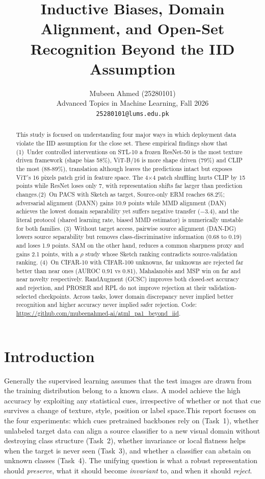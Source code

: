\documentclass{article}
\title{Inductive Biases, Domain Alignment, and Open-Set Recognition Beyond the IID Assumption}
\author{%
  Mubeen Ahmed (25280101)\\
  Advanced Topics in Machine Learning, Fall 2026\\
  \texttt{25280101@lums.edu.pk}
}
\begin{document}
\maketitle

\begin{abstract}

This study is focused on understanding four major ways in which deployment data violate the IID assumption for the close set. These empirical findings show that (1)~Under controlled interventions on STL-10 a frozen ResNet-50 is the most texture driven framework (shape bias 58\%), ViT-B/16 is more shape driven (79\%) and CLIP the most (88-89\%), translation although leaves the predictions intact but exposes ViT's 16 pixels patch grid in feature space. The 4$\times$4 patch shuffling hurts CLIP by 15 points while ResNet loses only 7, with representation shifts far larger than prediction changes.(2)~On PACS with Sketch as target, Source-only ERM reaches 68.2\%; adversarial alignment (DANN) gains 10.9 points while MMD alignment (DAN) achieves the lowest domain separability yet suffers negative transfer ($-$3.4), and the literal protocol (shared learning rate, biased MMD estimator) is numerically unstable for both families. (3)~Without target access, pairwise source alignment (DAN-DG) lowers source separability but removes class-discriminative information (0.68 to 0.19) and loses 1.9 points.  SAM on the other hand, reduces a common sharpness proxy and gains 2.1 points, with a $\rho$ study whose Sketch ranking contradicts source-validation ranking. (4)~On CIFAR-10 with CIFAR-100 unknowns, far unknowns are rejected far better than near ones (AUROC 0.91 vs 0.81), Mahalanobis and MSP win on far and near novelty respectively. RandAugment (GCSC) improves both closed-set accuracy and rejection, and PROSER and RPL do not improve rejection at their validation-selected checkpoints. Across tasks, lower domain discrepancy never implied better recognition and higher accuracy never implied safer rejection.
Code: \url{https://github.com/mubeenahmed-ai/atml_pa1_beyond_iid}.
\end{abstract}




\section{Introduction}

Generally the supervised learning assumes that the test images are drawn from the training distribution belong to a known class. A model achieve the high accuracy by exploiting any statistical cues, irrespective of whether or not that cue survives a change of texture, style, position or label space.This report focuses on the four experiments: which cues
pretrained backbones rely on (Task~1), whether unlabeled target data can align a source classifier to a new visual domain without destroying class structure (Task~2), whether invariance or local flatness helps when the target is never seen (Task~3), and whether a classifier can abstain on unknown classes (Task~4). The unifying question is what a robust
representation should \emph{preserve}, what it should become \emph{invariant} to, and when it should \emph{reject}. 
\end{document}
